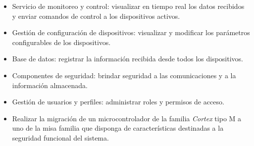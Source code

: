 \begin{itemize}
	
    \item Servicio de monitoreo y control: visualizar en tiempo real los datos recibidos y enviar comandos de control a los dispositivos activos. 

    \item Gestión de configuración de dispositivos: visualizar y modificar los parámetros configurables de los dispositivos. 

    \item Base de datos: registrar la información recibida desde todos los dispositivos.

    \item Componentes de seguridad: brindar seguridad a las comunicaciones y a la información almacenada. 

    \item Gestión de usuarios y perfiles: administrar roles y permisos de acceso.

    \item Realizar la migración de un microcontrolador de la familia \textit{Cortex} tipo M \citep{cortex} a uno de la misa familia que disponga de características destinadas a la seguridad funcional del sistema. 

\end{itemize}




